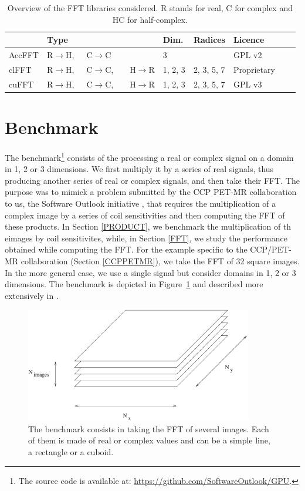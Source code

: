 \documentclass[12pt, a4paper]{article}
\begin{document}
\begin{table}[H]
\captionsetup{width=0.8\textwidth}
\centering
\begin{tabular}{|p{2.5cm}||p{2.5cm}|p{1cm}|p{3cm}|p{3cm}|p{2cm}|p{2cm}|}
\hline
& Type & Dim. & Radices & Licence \\
\hline
\hline
AccFFT & R$\to$H,\ \ \  C$\to$C& 3& & GPL v2\\
\hline
clFFT  &  R$\to$H,\ \ \  C$\to$C,\ \ \ \  H$\to$R& 1, 2, 3 & 2, 3, 5, 7 & Proprietary\\
\hline
cuFFT  &  R$\to$H,\ \ \  C$\to$C,\ \ \ \  H$\to$R & 1, 2, 3 & 2, 3, 5, 7 & GPL v3\\
\hline
\end{tabular}
\caption{Overview of the FFT libraries considered. R stands for real, C for complex and HC for half-complex.}
\label{ffttable}
\end{table}

\section{Benchmark}
The benchmark\footnote{The source code is available at:
  \hyperlink{https://github.com/SoftwareOutlook/GPU}{https://github.com/SoftwareOutlook/GPU}.}
consists of the processing a real or complex signal on a domain in 1,
2 or 3 dimensions. We first multiply it by a series of real signals,
thus producing another series of real or complex signals, and then
take their FFT.  The purpose was to mimick a problem submitted by the
CCP PET-MR collaboration \cite{ccppetmr} to us, the Software Outlook
initiative \cite{softwareoutlook}, that requires the multiplication of
a complex image by a series of coil sensitivities and then computing
the FFT of these products. In Section \ref{PRODUCT}, we benchmark the
multiplication of th eimages by coil sensitivites, while, in Section
\ref{FFT}, we study the performance obtained while computing the
FFT. For the example specific to the CCP/PET-MR collaboration (Section
\ref{CCPPETMR}), we take the FFT of 32 square images. In the more
general case, we use a single signal but consider domains in 1, 2 or 3
dimensions. The benchmark is depicted in Figure~\ref{benchmark} and
described more extensively in \cite{FFTREPORT}.

\begin{figure}[H]
\captionsetup{width=0.6\textwidth}
\centering
\includegraphics[height=5cm]{benchmark.pdf}
\caption{The benchmark consists in taking the FFT of several images. Each of them is made of real or complex values and can be a simple line, a rectangle or a cuboid.}
\label{benchmark}
\end{figure}
\end{document}
